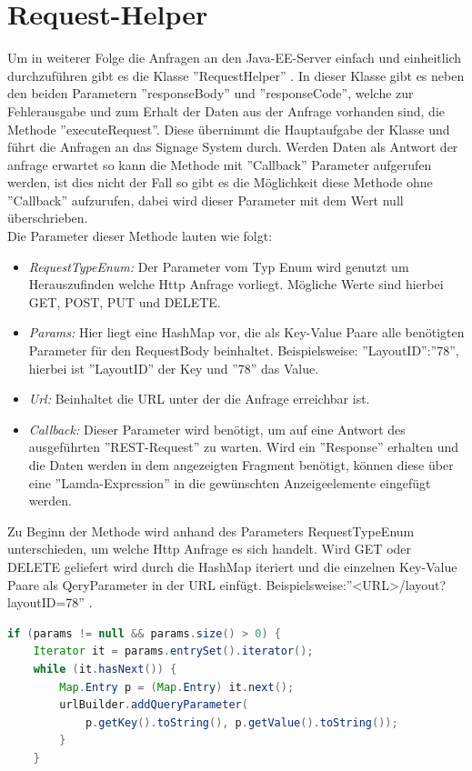 \section{Request-Helper}
Um in weiterer Folge die Anfragen an den Java-EE-Server einfach und einheitlich durchzuführen gibt es die Klasse ''RequestHelper'' . In dieser Klasse gibt es neben den beiden Parametern ''responseBody'' und ''responseCode'', welche zur Fehlerausgabe und zum Erhalt der Daten aus der Anfrage vorhanden sind, die Methode ''executeRequest''. Diese übernimmt die Hauptaufgabe der Klasse und führt die Anfragen an das Signage System durch. Werden Daten als Antwort der anfrage erwartet so kann die Methode mit ''Callback'' Parameter aufgerufen werden, ist dies nicht der Fall so gibt es die Möglichkeit diese Methode ohne ''Callback'' aufzurufen, dabei wird dieser Parameter mit dem Wert null überschrieben.
\\
Die Parameter dieser Methode lauten wie folgt:
\\
\begin{itemize}
	\item {\em RequestTypeEnum:} Der Parameter vom Typ Enum wird genutzt um Herauszufinden welche Http Anfrage vorliegt. Mögliche Werte sind hierbei GET, POST, PUT und DELETE.
	
	\item {\em Params:} Hier liegt eine HashMap vor, die als Key-Value Paare alle benötigten Parameter für den RequestBody beinhaltet. Beispielsweise: ''LayoutID'':''78'', hierbei ist ''LayoutID'' der Key und ''78'' das Value.
		
	\item {\em Url:} Beinhaltet die URL unter der die Anfrage erreichbar ist. 
	
	\item {\em Callback:} Dieser Parameter wird benötigt, um auf eine Antwort des ausgeführten ''REST-Request'' zu warten. Wird ein ''Response'' erhalten und die Daten werden in dem angezeigten Fragment benötigt, können diese über eine ''Lamda-Expression'' in die gewünschten Anzeigeelemente eingefügt werden. 
\end{itemize}
Zu Beginn der Methode wird anhand des Parameters RequestTypeEnum unterschieden, um welche Http Anfrage es sich handelt. Wird GET oder DELETE geliefert wird durch die HashMap iteriert und die einzelnen Key-Value Paare als QeryParameter in der URL einfügt.
Beispielsweise:''<URL>/layout?layoutID=78'' .
\begin{lstlisting}[language=Java,caption={GET oder DELETE Request}]
if (params != null && params.size() > 0) {
    Iterator it = params.entrySet().iterator();
    while (it.hasNext()) {
     	Map.Entry p = (Map.Entry) it.next();
	    urlBuilder.addQueryParameter(
	      	p.getKey().toString(), p.getValue().toString());
        }
    }
\end{lstlisting}
